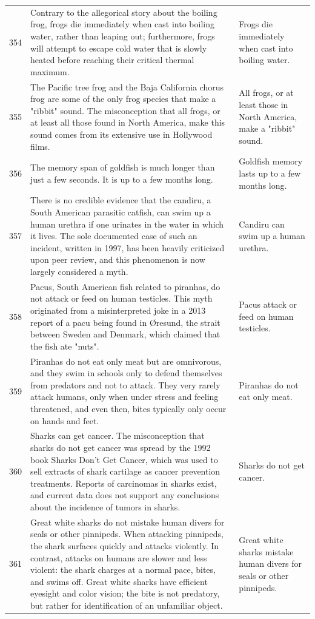 \begin{tabular}{c|p{}|p{}}
354 & Contrary to the allegorical story about the boiling frog, frogs die immediately when cast into boiling water, rather than leaping out; furthermore, frogs will attempt to escape cold water that is slowly heated before reaching their critical thermal maximum. & Frogs die immediately when cast into boiling water. \\
355 & The Pacific tree frog and the Baja California chorus frog are some of the only frog species that make a "ribbit" sound. The misconception that all frogs, or at least all those found in North America, make this sound comes from its extensive use in Hollywood films. & All frogs, or at least those in North America, make a "ribbit" sound. \\
356 & The memory span of goldfish is much longer than just a few seconds. It is up to a few months long. & Goldfish memory lasts up to a few months long. \\
357 & There is no credible evidence that the candiru, a South American parasitic catfish, can swim up a human urethra if one urinates in the water in which it lives. The sole documented case of such an incident, written in 1997, has been heavily criticized upon peer review, and this phenomenon is now largely considered a myth. & Candiru can swim up a human urethra. \\
358 & Pacus, South American fish related to piranhas, do not attack or feed on human testicles. This myth originated from a misinterpreted joke in a 2013 report of a pacu being found in Øresund, the strait between Sweden and Denmark, which claimed that the fish ate "nuts". & Pacus attack or feed on human testicles. \\
359 & Piranhas do not eat only meat but are omnivorous, and they swim in schools only to defend themselves from predators and not to attack. They very rarely attack humans, only when under stress and feeling threatened, and even then, bites typically only occur on hands and feet. & Piranhas do not eat only meat. \\
360 & Sharks can get cancer. The misconception that sharks do not get cancer was spread by the 1992 book Sharks Don't Get Cancer, which was used to sell extracts of shark cartilage as cancer prevention treatments. Reports of carcinomas in sharks exist, and current data does not support any conclusions about the incidence of tumors in sharks. & Sharks do not get cancer. \\
361 & Great white sharks do not mistake human divers for seals or other pinnipeds. When attacking pinnipeds, the shark surfaces quickly and attacks violently. In contrast, attacks on humans are slower and less violent: the shark charges at a normal pace, bites, and swims off. Great white sharks have efficient eyesight and color vision; the bite is not predatory, but rather for identification of an unfamiliar object. & Great white sharks mistake human divers for seals or other pinnipeds. \\

\end{tabular}
